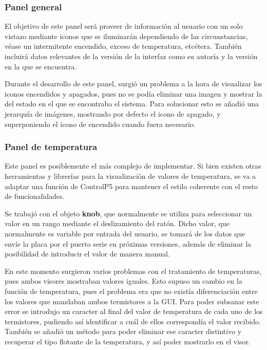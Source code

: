 \subsubsection{Panel general}

El objetivo de este panel será proveer de información al usuario con un solo vistazo mediante iconos que se iluminarán dependiendo de las circunstancias, véase un intermitente encendido, exceso de temperatura, etcétera. También incluirá datos relevantes de la versión de la interfaz como su autoría y la versión en la que se encuentra. 

Durante el desarrollo de este panel, surgió un problema a la hora de visualizar los iconos encendidos y apagados, pues no se podía eliminar una imagen y mostrar la del estado en el que se encontraba el sistema. Para solucionar esto se añadió una jerarquía de imágenes, mostrando por defecto el icono de apagado, y superponiendo el icono de encendido cuando fuera necesario.

\subsubsection{Panel de temperatura}

Este panel es posiblemente el más complejo de implementar. Si bien existen otras herramientas y librerías para la visualización de valores de temperatura, se va a adaptar una función de ControlP5 para mantener el estilo coherente con el resto de funcionalidades. 

Se trabajó con el objeto \textbf{knob}, que normalmente se utiliza para seleccionar un valor en un rango mediante el deslizamiento del ratón. Dicho valor, que normalmente es variable por entrada del usuario, se tomará de los datos que envíe la placa por el puerto serie en próximas versiones, además de eliminar la posibilidad de introducir el valor de manera manual. 

En este momento surgieron varios problemas con el tratamiento de temperaturas, pues ambos visores mostraban valores iguales. Esto supuso un cambio en la función de temperatura, pues el problema era que no existía diferenciación entre los valores que mandaban ambos termistores a la GUI. Para poder subsanar este error se introdujo un caracter al final del valor de temperatura de cada uno de los termistores, pudiendo así identificar a cuál de ellos correspondía el valor recibido. También se añadió un método para poder eliminar ese caracter distintivo y recuperar el tipo flotante de la temperatura, y así poder mostrarlo en el visor. 

